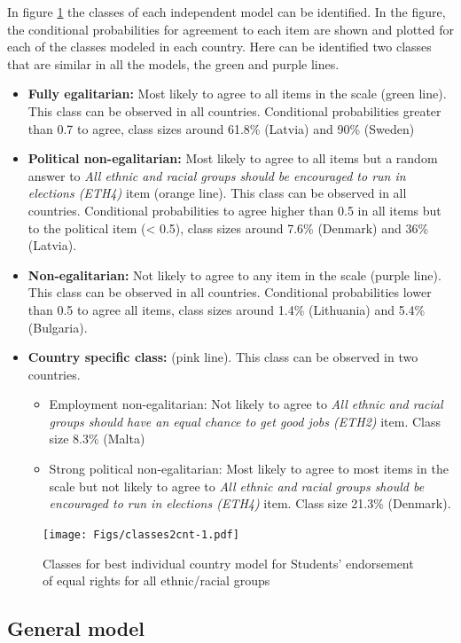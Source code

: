 \documentclass[12pt,a4paper,oneside]{reedthesis}
\providecommand{\tightlist}{%
  \setlength{\itemsep}{0pt}\setlength{\parskip}{0pt}}
\begin{document}
In figure \ref{fig:classes2cnt} the classes of each independent model can be identified. In the figure, the conditional probabilities for agreement to each item are shown and plotted for each of the classes modeled in each country. Here can be identified two classes that are similar in all the models, the green and purple lines.
\begin{itemize}
\item
  \textbf{Fully egalitarian:} Most likely to agree to all items in the scale (green line). This class can be observed in all countries. Conditional probabilities greater than 0.7 to agree, class sizes around 61.8\% (Latvia) and 90\% (Sweden)
\item
  \textbf{Political non-egalitarian:} Most likely to agree to all items but a random answer to \emph{All ethnic and racial groups should be encouraged to run in elections (ETH4)} item (orange line). This class can be observed in all countries. Conditional probabilities to agree higher than 0.5 in all items but to the political item (\textless{} 0.5), class sizes around 7.6\% (Denmark) and 36\% (Latvia).
\item
  \textbf{Non-egalitarian:} Not likely to agree to any item in the scale (purple line). This class can be observed in all countries. Conditional probabilities lower than 0.5 to agree all items, class sizes around 1.4\% (Lithuania) and 5.4\% (Bulgaria).
\item
  \textbf{Country specific class:} (pink line). This class can be observed in two countries.
  \begin{itemize}
  \tightlist
  \item
    Employment non-egalitarian: Not likely to agree to \emph{All ethnic and racial groups should have an equal chance to get good jobs (ETH2)} item. Class size 8.3\% (Malta)
  \item
    Strong political non-egalitarian: Most likely to agree to most items in the scale but not likely to agree to \emph{All ethnic and racial groups should be encouraged to run in elections (ETH4)} item. Class size 21.3\% (Denmark).
  \end{itemize}
\end{itemize}
\begin{figure}
\centering
\texttt{[image: Figs/classes2cnt-1.pdf]}
\caption{\label{fig:classes2cnt}Classes for best individual country model for Students' endorsement of equal rights for all ethnic/racial groups}
\end{figure}
\hypertarget{general-model-1}{%
\subsection{General model}\label{general-model-1}}
\end{document}
